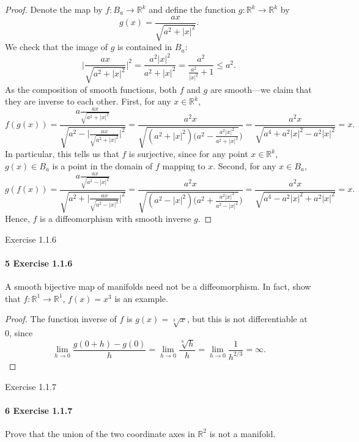 \documentclass[12pt]{article}
\newlength{\myparskip}
\newenvironment{fullbox}{\begin{lrbox}{\savefullbox}\begin{minipage}{\dimexpr\textwidth-2\fboxsep\relax}\setlength{\parskip}{\myparskip}}{\end{minipage}\end{lrbox}\framebox[\textwidth]{\usebox{\savefullbox}}}
\newenvironment{pbox}[1][]{\begin{fullbox}\ifx#1\empty\else\paragraph{#1}\phantom{}\fi}{\end{fullbox}}
\theoremstyle{definition}
\newcommand{\R}{\mathbb{R}}
\newcommand{\<}{\langle}
\renewcommand{\>}{\rangle}
\begin{document}
\begin{proof}
    Denote the map by $f : B_a \to \R^k$ and define the function $g : \R^k \to \R^k$ by
    \[
        g(x) = \frac{ax}{\sqrt{a^2 + |x|^2}}.
    \]
    We check that the image of $g$ is contained in $B_a$:
    \[
        \bigg|\frac{ax}{\sqrt{a^2 + |x|^2}}\bigg|^2
            = \frac{a^2|x|^2}{a^2 + |x|^2}
            = \frac{a^2}{\frac{a^2}{|x|^2} + 1}
            \leq a^2.
    \]
    As the composition of smooth functions, both $f$ and $g$ are smooth---we claim that they are inverse to each other.
    First, for any $x \in \R^k$,
    \[
        f(g(x))
            = \frac{a\frac{ax}{\sqrt{a^2 + |x|^2}}}{\sqrt{a^2 - \Big|\frac{ax}{\sqrt{a^2 + |x|^2}}\Big|^2}}
            = \frac{a^2x}{\sqrt{(a^2 + |x|^2)\Big(a^2 - \frac{a^2|x|^2}{a^2 + |x|^2}}\Big)}
            = \frac{a^2x}{\sqrt{a^4 + a^2|x|^2 - a^2|x|^2}}
            = x.
    \]
    In particular, this tells us that $f$ is surjective, since for any point $x \in \R^k$, $g(x) \in B_a$ is a point in the domain of $f$ mapping to $x$.
    Second, for any $x \in B_a$,
    \[
        g(f(x))
            = \frac{a\frac{ax}{\sqrt{a^2 - |x|^2}}}{\sqrt{a^2 + \Big|\frac{ax}{\sqrt{a^2 - |x|^2}}\Big|^2}}
            = \frac{a^2x}{\sqrt{(a^2 - |x|^2)\Big(a^2 + \frac{a^2|x|^2}{a^2 - |x|^2}}\Big)}
            = \frac{a^2x}{\sqrt{a^4 - a^2|x|^2 + a^2|x|^2}}
            = x.
    \]
    Hence, $f$ is a diffeomorphism with smooth inverse $g$.
\end{proof}

\begin{pbox}[5 Exercise 1.1.6]
    A smooth bijective map of manifolds need not be a diffeomorphism.
    In fact, show that $f : \R^1 \to \R^1$, $f(x) = x^3$ is an example.
\end{pbox}

\begin{proof}
    The function inverse of $f$ is $g(x) = \sqrt[3]{x}$, but this is not differentiable at $0$, since
    \[
        \lim_{h \to 0} \frac{g(0 + h) - g(0)}{h}
            = \lim_{h \to 0} \frac{\sqrt[3]{h}}{h}
            = \lim_{h \to 0} \frac{1}{h^{2/3}}
            = \infty.
    \]
\end{proof}

\begin{pbox}[6 Exercise 1.1.7]
    Prove that the union of the two coordinate axes in $\R^2$ is not a manifold.
\end{pbox}
\end{document}
